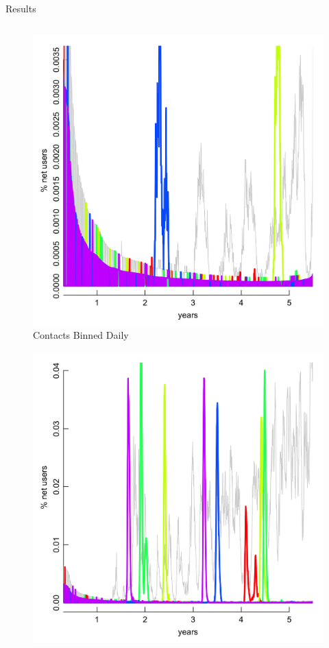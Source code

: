 \documentclass[final]{beamer} %
\newenvironment{oneCol}{\begin{column}[t]{0.225\paperwidth}}{\end{column}}
\newenvironment{threeCol}{\begin{column}[t]{0.715\paperwidth}}{\end{column}}
\begin{document}
\begin{frame}{}
\begin{columns}[t]
\begin{threeCol}
    \begin{block}{Results}
    \begin{columns}
    \begin{oneCol}
      \setcounter{figure}{0}
      \begin{figure}
        \caption{Contacts Binned Daily}
        \includegraphics[width=1.0\linewidth]{out1.png}
      \end{figure}
      \setcounter{figure}{3}
      \begin{figure}
        \includegraphics[width=1.0\linewidth]{out90.png}

\end{figure}
\end{oneCol}
\end{columns}
\end{block}
\end{threeCol}
\end{columns}
\end{frame}
\end{document}
